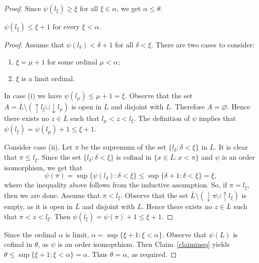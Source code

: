 \documentclass[10pt,a4paper]{amsart}
\newcommand{\var}{\varnothing}
\begin{document}
\begin{proof}
Since $\psi(l_\xi)\geq \xi$ for all $\xi\in\alpha$, we get $\alpha\leq \theta$. 


\begin{claim}\label{claimineq}
$\psi(l_{\xi})\leq \xi+1$ for every $\xi<\alpha$.    
\end{claim}

\begin{proof}
Assume that $\psi(l_\delta)<\delta+1$ for all $\delta<\xi$. There are two cases to consider:
\begin{enumerate}[label=(\roman*)]
    \item $\xi=\mu+1$ for some ordinal $\mu<\alpha$;
    \item $\xi$ is a limit ordinal.
\end{enumerate}

In case (i) we have $\psi(l_\mu)\leq \mu+1=\xi$. Observe that the set $A=\overline{L}\setminus({\uparrow}l_\xi\cup{\downarrow}l_{\mu})$ is open in $\overline{L}$ and disjoint with $L$. Therefore $A=\var$. Hence there exists no $z\in\overline{L}$ such that $l_\mu<z<l_\xi$. The definition of $\psi$ implies that $\psi(l_\xi)=\psi(l_\mu)+1\leq \xi+1$.

Consider case (ii). Let $\pi$ be the supremum of the set $\{l_{\delta}:\delta<\xi\}$ in $\overline{L}$. It is clear that $\pi\leq l_\xi$. Since the set $\{l_\delta:\delta<\xi\}$ is cofinal in $\{x\in\overline{L}:x<\pi\}$ and $\psi$ is an order isomorphism, we get that $$\psi(\pi)=\sup\{\psi(l_\delta):\delta<\xi\}\leq \sup\{\delta+1:\delta<\xi\}=\xi,$$
where the inequality above follows from the inductive assumption. So, if $\pi=l_\xi$, then we are done. Assume that $\pi<l_\xi$. Observe that the set $\overline{L}\setminus({\downarrow}\pi\cup {\uparrow}l_\xi)$ is empty, as it is open in $\overline{L}$ and disjoint with $L$. Hence there exists no $z\in\overline{L}$ such that $\pi<z<l_\xi$. Then 
$\psi(l_\xi)=\psi(\pi)+1\leq \xi+1$. 
\end{proof}

Since the ordinal $\alpha$ is limit, $\alpha=\sup\{\xi+1: \xi<\alpha\}$. Observe that $\psi(L)$ is cofinal in $\theta$, as $\psi$ is an order isomoprhism. Then   
Claim~\ref{claimineq} yields $\theta\leq \sup\{\xi+1: \xi<\alpha\}=\alpha$. Thus $\theta=\alpha$, as required. 
\end{proof}
\end{document}
